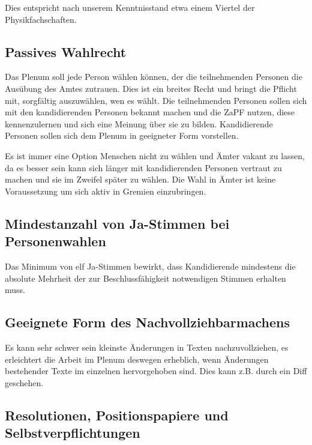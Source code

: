 \documentclass[
  ngerman,
  a4paper,
  oneside]{scrartcl}
\begin{document}
Dies entspricht nach unserem Kenntnisstand etwa einem Viertel der
Physikfachschaften.

\subsection*{Passives Wahlrecht}\label{passives-wahlrecht}

Das Plenum soll jede Person wählen können, der die teilnehmenden
Personen die Ausübung des Amtes zutrauen. Dies ist ein breites Recht und
bringt die Pflicht mit, sorgfältig auszuwählen, wen es wählt. Die
teilnehmenden Personen sollen sich mit den kandidierenden Personen
bekannt machen und die ZaPF nutzen, diese kennenzulernen und sich eine
Meinung über sie zu bilden. Kandidierende Personen sollen sich dem
Plenum in geeigneter Form vorstellen.

Es ist immer eine Option Menschen nicht zu wählen und Ämter vakant zu
lassen, da es besser sein kann sich länger mit kandidierenden Personen
vertraut zu machen und sie im Zweifel später zu wählen. Die Wahl in
Ämter ist keine Voraussetzung um sich aktiv in Gremien einzubringen.

\subsection*{Mindestanzahl von Ja-Stimmen bei
Personenwahlen}\label{mindestanzahl-von-ja-stimmen-bei-personenwahlen}

Das Minimum von elf Ja-Stimmen bewirkt, dass Kandidierende mindestens
die absolute Mehrheit der zur Beschlussfähigkeit notwendigen Stimmen
erhalten muss.

\subsection*{Geeignete Form des
Nachvollziehbarmachens}\label{geeignete-form-des-nachvollziehbarmachens}

Es kann sehr schwer sein kleinste Änderungen in Texten nachzuvollziehen,
es erleichtert die Arbeit im Plenum deswegen erheblich, wenn Änderungen
bestehender Texte im einzelnen hervorgehoben sind. Dies kann z.B. durch
ein Diff geschehen.

\subsection*{Resolutionen, Positionspapiere und
Selbstverpflichtungen}\label{resolutionen-positionspapiere-und-selbstverpflichtungen}
\end{document}
